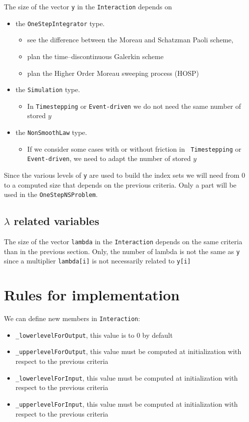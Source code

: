 The size of the vector {\tt y} in the {\tt Interaction} depends on
\begin{itemize}
\item the {\tt  OneStepIntegrator} type.
  \begin{itemize}
  \item see the difference between the Moreau and Schatzman Paoli
    scheme,
  \item plan the time--discontinuous Galerkin scheme
  \item plan the Higher Order Moreau sweeping process (HOSP)
  \end{itemize}
\item the {\tt  Simulation} type.
  \begin{itemize}
  \item In {\tt Timestepping} or {\tt Event-driven} we do not need the same number of stored $y$
  \end{itemize}

\item the {\tt NonSmoothLaw} type.
  \begin{itemize}
  \item If we consider some cases with or without friction in {\tt
      Timestepping} or {\tt Event-driven}, we need to adapt the number
    of stored $y$
  \end{itemize}

\end{itemize}

Since the various levels of  {\tt y} are used to build the index sets we will need from $0$ to a computed size that depends on the previous criteria. Only a part will be used in the {\tt OneStepNSProblem}.

\subsection{$\lambda$ related variables}

The size of the vector {\tt lambda} in the {\tt Interaction} depends on the same criteria than in the previous section.  Only, the number of lambda is not the same as {\tt y} since a multiplier {\tt lambda[i]} is not necessarily related to {\tt y[i]}

\section{Rules for implementation}

We can define new members in {\tt Interaction}:
\begin{itemize}
\item {\tt \_lowerlevelForOutput}, this value is to $0$ by default
\item {\tt \_upperlevelForOutput},  this value must be computed at initialization with respect to the previous criteria
\item {\tt \_lowerlevelForInput},  this value must be computed at initialization with respect to the previous criteria
\item {\tt \_upperlevelForInput},  this value must be computed at initialization with respect to the previous criteria
\end{itemize}




